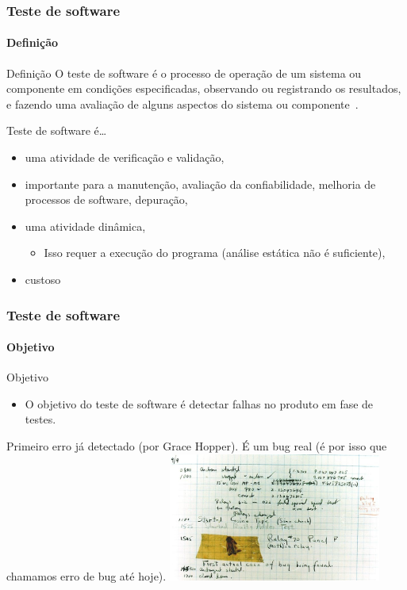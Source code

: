 \begin{frame}[hasprev=true, hasnext=true]
\frametitle{Teste de software}
\framesubtitle{Definição}
\label{concept:teste-de-software}

\begin{block:concept}{Definição}
O teste de software é o processo de operação de um sistema ou componente em condições especificadas, observando ou registrando os resultados, e fazendo uma avaliação de alguns aspectos do sistema ou componente~\cite{ieee610.12:1990}.
\end{block:concept}

\begin{block:fact}{Teste de software é\dots{}}
\begin{itemize}
	\item uma atividade de verificação e validação,

	\item importante para a manutenção, avaliação da confiabilidade, melhoria de processos de software, depuração,

	\item uma atividade dinâmica,
	\begin{itemize}
		\item Isso requer a execução do programa (análise estática não é suficiente),
	\end{itemize}

	\item custoso~\cite{harrold:2000}
\end{itemize}
\end{block:fact}
\end{frame}



\begin{frame}
\frametitle{Teste de software}
\framesubtitle{Objetivo}

\begin{block:fact}{Objetivo}
\begin{itemize}
	\item O objetivo do teste de software é detectar falhas no produto em fase de testes.
\end{itemize}
\end{block:fact}

\begin{block:fact}{}
Primeiro erro já detectado (por Grace Hopper). É um bug real (é por isso que chamamos erro de bug até hoje).
\centering
\includegraphics[width=7cm]{teste-de-software/conceitos-basicos/Imagens/first-bug}
\end{block:fact}
\end{frame}


